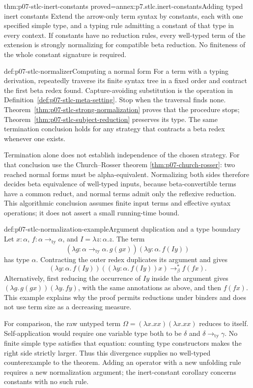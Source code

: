 \begin{hbcorollary}{thm:p07-stlc-inert-constants}
 {proved=annex:p7.stlc.inert-constants}{Adding typed inert constants}
Extend the arrow-only term syntax by constants, each with one specified simple
type, and a typing rule admitting a constant of that type in every context.
If constants have no reduction rules, every well-typed term of the extension
is strongly normalizing for compatible beta reduction. No finiteness of the
whole constant signature is required.
\end{hbcorollary}

\begin{hbmethod}{def:p07-stlc-normalizer}{Computing a normal form}
For a term with a typing derivation, repeatedly traverse its finite syntax
tree in a fixed order and contract the first beta redex found. Capture-avoiding
substitution is the operation in Definition~\ref{def:p07-stlc-meta-setting}.
Stop when the traversal finds none. Theorem~\ref{thm:p07-stlc-strong-normalization}
proves that the procedure stops; Theorem~\ref{thm:p07-stlc-subject-reduction}
preserves its type. The same termination conclusion holds for any strategy
that contracts a beta redex whenever one exists.

Termination alone does not establish independence of the chosen strategy.
For that conclusion use the Church--Rosser theorem
\ref{thm:p07-church-rosser}: two reached normal forms must be
alpha-equivalent. Normalizing both sides therefore decides beta equivalence
of well-typed inputs, because beta-convertible terms have a common reduct,
and normal terms admit only the reflexive reduction. This algorithmic
conclusion assumes finite input terms and effective syntax operations; it
does not assert a small running-time bound.
\end{hbmethod}

\begin{hbexample}{def:p07-stlc-normalization-example}{Argument duplication and a type boundary}
Let \(x:\alpha\), \(f:\alpha\mathbin{\to_{\mathrm{ty}}}\alpha\), and
\(I=\lambda z{:}\alpha.z\). The term
\[
 (\lambda g{:}\alpha\mathbin{\to_{\mathrm{ty}}}\alpha.\,g(gx))
       (\lambda y{:}\alpha.\,f(Iy))
\]
has type \(\alpha\). Contracting the outer redex duplicates its argument
and gives
\[
 (\lambda y{:}\alpha.\,f(Iy))
       ((\lambda y{:}\alpha.\,f(Iy))x)
 \to_\beta^* f(fx).
\]
Alternatively, first reducing the occurrence of \(Iy\) inside the argument
gives \((\lambda g.\,g(gx))(\lambda y.\,fy)\), with the same annotations
as above, and then \(f(fx)\). This example explains why the proof permits
reductions under binders and does not use term size as a decreasing measure.

For comparison, the raw untyped term
\(\Omega=(\lambda x.xx)(\lambda x.xx)\) reduces to itself.
Self-application would require one variable type both to be \(\delta\)
and \(\delta\mathbin{\to_{\mathrm{ty}}}\gamma\). No finite simple type
satisfies that equation: counting type constructors makes the right side
strictly larger. Thus this divergence supplies no well-typed counterexample
to the theorem. Adding an operator with a new unfolding rule requires a new
normalization argument; the inert-constant corollary concerns constants with
no such rule.
\end{hbexample}
